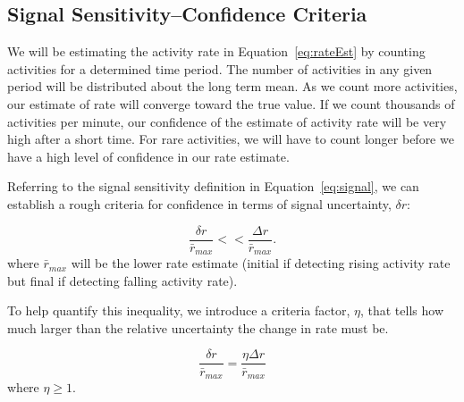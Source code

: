 \documentclass{article}
\begin{document}
\subsection{Signal Sensitivity--Confidence Criteria} 

We 
\reversemarginpar\marginpar{\raggedleft
%
    \begin{tikzpicture}[scale=0.26]]
\draw [red, very thick, rotate around={-60: (3.0, 0)}] (-0.7, -0.7) rectangle(3.7, 0.7);
%
\draw [very thick, <->] (0.25000000000000006, 0.4330127018922193) -- (1.25, 2.165063509461097) ;
\draw [very thick, <->] (1.75, 2.165063509461097) -- (2.75, 0.4330127018922193) ;
\draw [very thick, <->] (2.5, 0) -- (0.5, 0) ;
%
\draw [orange, ultra thick] (0,0) circle [radius= 0.5 ];
\draw [yellow, ultra thick] ( 1.5 , 2.59807621135 ) circle [radius= 0.5 ];
\draw [green,  ultra thick] ( 3.0 , 0 ) circle [radius= 0.5 ];
    \end{tikzpicture}
%
%
}
will be estimating the activity rate in Equation~\ref{eq:rateEst} by counting activities for a determined time period.  The
number of activities in any given period will be distributed about the long term mean. As we count more activities, our
estimate of rate will converge toward the true value.  If we count thousands of activities per minute, our confidence of the estimate
of activity rate will be very high after a short time.  For rare activities, we will have to count longer before we have
a high level of confidence in our rate estimate.

Referring to the signal sensitivity definition in Equation~\ref{eq:signal}, we can establish a rough criteria for confidence
in terms of signal uncertainty, $\delta r$:

\begin{equation}
    \label{eq:criteria}
    \frac{\delta r}{\bar{r}_{max}} << \frac{\Delta r}{\bar{r}_{max}}.
\end{equation}
where $\bar{r}_{max}$ will be the lower rate estimate (initial if detecting rising activity rate but final if detecting falling activity rate).

To help quantify this inequality, we introduce a criteria factor, $\eta$, that tells how much larger than the relative
uncertainty the change in rate must be.

\begin{equation}
    \label{eq:criteriaParam}
    \frac{\delta r}{\bar{r}_{max}} = \frac{\eta \Delta r}{\bar{r}_{max}}
\end{equation}
where $\eta \ge 1$.
\end{document}
